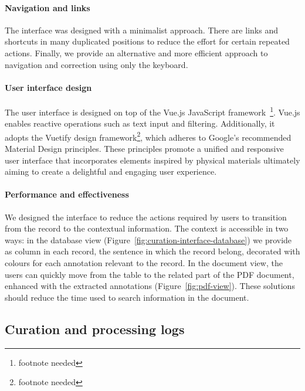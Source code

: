 \documentclass[a4paper]{article}
\begin{document}
\paragraph{Navigation and links} The interface was designed with a minimalist approach. 
There are links and shortcuts in many duplicated positions to reduce the effort for certain repeated actions.
Finally, we provide an alternative and more efficient approach to navigation and correction using only the keyboard. 

\paragraph{User interface design}
The user interface is designed on top of the Vue.js JavaScript framework~\footnote{footnote needed}.  
Vue.js enables reactive operations such as text input and filtering. 
Additionally, it adopts the Vuetify design framework\footnote{footnote needed}, which adheres to Google's recommended Material Design principles.
These principles promote a unified and responsive user interface that incorporates elements inspired by physical materials ultimately aiming to create a delightful and engaging user experience.

\paragraph{Performance and effectiveness}
We designed the interface to reduce the actions required by users to transition from the record to the contextual information. 
The context is accessible in two ways: in the database view (Figure~\ref{fig:curation-interface-database}) we provide as column in each record, the sentence in which the record belong, decorated with colours for each annotation relevant to the record.
In the document view, the users can quickly move from the table to the related part of the PDF document, enhanced with the extracted annotations (Figure~\ref{fig:pdf-view}). 
These solutions should reduce the time used to search information in the document. 

\subsection{Curation and processing logs}
\label{subsec:curation-and-processing-logs}
\end{document}
